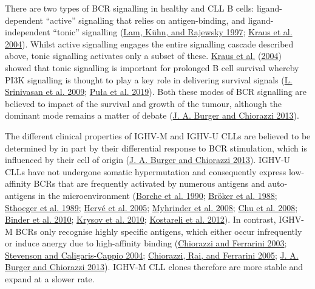 \documentclass[11pt, a4paper, twosided]{book}
\begin{document}
There are two types of BCR signalling in healthy and CLL B cells: ligand-dependent ``active'' signalling that relies on antigen-binding, and ligand-independent ``tonic'' signalling (\protect\hyperlink{ref-Lam1997}{Lam, Kühn, and Rajewsky 1997}; \protect\hyperlink{ref-Kraus2004}{Kraus et al. 2004}). Whilst active signalling engages the entire signalling cascade described above, tonic signalling activates only a subset of these. \protect\hyperlink{ref-Kraus2004}{Kraus et al.} (\protect\hyperlink{ref-Kraus2004}{2004}) showed that tonic signalling is important for prolonged B cell survival whereby PI3K signalling is thought to play a key role in delivering survival signals (\protect\hyperlink{ref-Srinivasan2009}{L. Srinivasan et al. 2009}; \protect\hyperlink{ref-Pula2019}{Puła et al. 2019}). Both these modes of BCR signalling are believed to impact of the survival and growth of the tumour, although the dominant mode remains a matter of debate (\protect\hyperlink{ref-Burger2013}{J. A. Burger and Chiorazzi 2013}).

The different clinical properties of IGHV-M and IGHV-U CLLs are believed to be determined by in part by their differential response to BCR stimulation, which is influenced by their cell of origin (\protect\hyperlink{ref-Burger2013}{J. A. Burger and Chiorazzi 2013}). IGHV-U CLLs have not undergone somatic hypermutation and consequently express low-affinity BCRs that are frequently activated by numerous antigens and auto-antigens in the microenvironment (\protect\hyperlink{ref-Borche1990}{Borche et al. 1990}; \protect\hyperlink{ref-Broker1988}{Bröker et al. 1988}; \protect\hyperlink{ref-Sthoeger1989}{Sthoeger et al. 1989}; \protect\hyperlink{ref-Herve2005}{Hervé et al. 2005}; \protect\hyperlink{ref-Lanemo2008}{Myhrinder et al. 2008}; \protect\hyperlink{ref-Chu2008}{Chu et al. 2008}; \protect\hyperlink{ref-Binder2010}{Binder et al. 2010}; \protect\hyperlink{ref-Krysov2010}{Krysov et al. 2010}; \protect\hyperlink{ref-Kostareli2012}{Kostareli et al. 2012}). In contrast, IGHV-M BCRs only recognise highly specific antigens, which either occur infrequently or induce anergy due to high-affinity binding (\protect\hyperlink{ref-Chiorazzi2003}{Chiorazzi and Ferrarini 2003}; \protect\hyperlink{ref-Stevenson2004}{Stevenson and Caligaris-Cappio 2004}; \protect\hyperlink{ref-Chiorazzi2005}{Chiorazzi, Rai, and Ferrarini 2005}; \protect\hyperlink{ref-Burger2013}{J. A. Burger and Chiorazzi 2013}). IGHV-M CLL clones therefore are more stable and expand at a slower rate.
\end{document}

